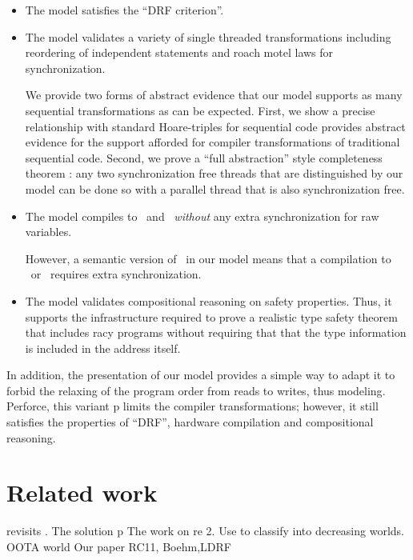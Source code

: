 \begin{itemize}
\item The model satisfies the ``DRF criterion''.  

\item The model validates a variety of single threaded transformations including reordering of independent statements and roach motel laws for synchronization.  

We provide two forms of abstract evidence that our model supports as many sequential transformations as can be expected.  First, we show a precise relationship with standard Hoare-triples for sequential code provides abstract evidence for the support afforded for compiler  transformations of traditional sequential code.  Second, we prove a ``full abstraction'' style completeness  theorem : any two synchronization free threads that are distinguished by our model can be done so with a parallel thread that is also synchronization free. 

\item The model compiles to \armeight\ and \tso\ {\em without} any extra synchronization for raw variables.  

However, a semantic version of \mca\ in our model means that a compilation to \armseven\ or \ppc\ requires extra synchronization.  

\item The model validates compositional reasoning on safety properties.  Thus, it supports the infrastructure required to prove a realistic type safety theorem that includes racy programs without requiring that that the type information is included in the address itself.
\end{itemize}
In addition, the presentation of our model provides a simple way to adapt it to forbid the relaxing of the program order from reads to writes, thus modeling\cite{Dolan:2018:BDR:3192366.3192421,BoehmOOTA}.  Perforce, this variant p limits the compiler transformations; however, it still satisfies the properties of ``DRF'', hardware compilation and compositional reasoning. 


    

\section{Related work}

\citet{BoehmOOTA} revisits \oota.  The solution p
The work on re
2. Use\cite{BoehmOOTA} to 
classify into decreasing worlds.
           OOTA world
              Our paper
                 RC11, Boehm,LDRF






